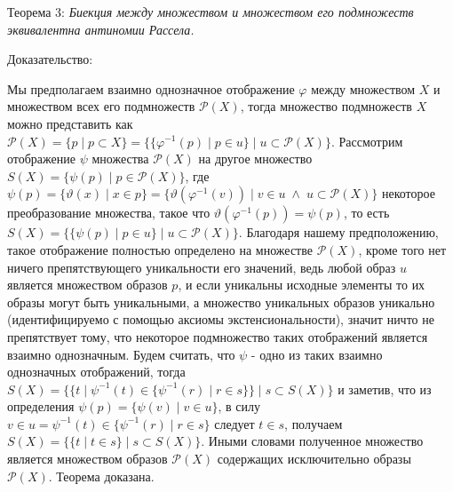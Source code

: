 \documentclass[12pt]{article}
\begin{document}
Теорема 3: {\sl Биекция между множеством и множеством его подмножеств эквивалентна антиномии Рассела.}

Доказательство: 

Мы предполагаем взаимно однозначное отображение $\varphi$ между множеством $X$ и множеством всех его подмножеств $\mathcal{P}(X)$, тогда множество подмножеств $X$ можно представить как $\mathcal{P}(X) = \{ p \mid p \subset X \} = \{ \{ \varphi^{-1}(p) \mid p \in u \} \mid u \subset \mathcal{P}(X) \}$. Рассмотрим отображение $\psi$ множества $\mathcal{P}(X)$ на другое множество $S(X) = \{ \psi(p) \mid p \in \mathcal{P}(X) \}$, где $\psi(p) = \{ \vartheta(x) \mid x \in p \} = \{ \vartheta(\varphi^{-1}(v)) \mid v \in u \; \wedge \; u \subset \mathcal{P}(X) \}$ некоторое преобразование множества, такое что $\vartheta(\varphi^{-1}(p)) = \psi(p)$, то есть $S(X) = \{ \{ \psi(p) \mid p \in u \} \mid u \subset \mathcal{P}(X) \}$. Благодаря нашему предположению, такое отображение полностью определено на множестве $\mathcal{P}(X)$, кроме того нет ничего препятствующего уникальности его значений, ведь любой образ $u$ является множеством образов $p$, и если уникальны исходные элементы то их образы могут быть уникальными, а множество уникальных образов уникально (идентифицируемо с помощью аксиомы экстенсиональности), значит ничто не препятствует тому, что некоторое подмножество таких отображений является взаимно однозначным. Будем считать, что $\psi$ - одно из таких взаимно однозначных отображений, тогда $S(X) = \{ \{ t \mid \psi^{-1}(t) \in \{ \psi^{-1}(r) \mid r \in s \} \} \mid s \subset S(X) \}$ и заметив, что из определения $\psi(p) = \{ \psi(v) \mid v \in u \}$, в силу $v \in u = \psi^{-1}(t) \in \{ \psi^{-1}(r) \mid r \in s \}$ следует $t \in s$, получаем $S(X) = \{ \{ t \mid t \in s \} \mid s \subset S(X) \}$. Иными словами полученное множество является множеством образов $\mathcal{P}(X)$ содержащих исключительно образы $\mathcal{P}(X)$. Теорема доказана.
\end{document}
